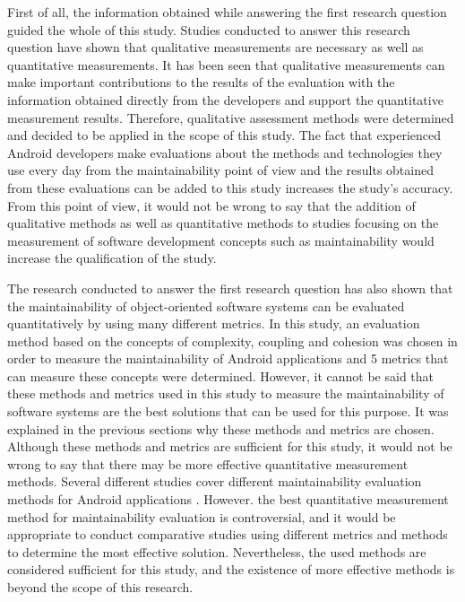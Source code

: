 First of all, the information obtained while answering the first research question guided the whole of this study. Studies conducted to answer this research question have shown that qualitative measurements are necessary as well as quantitative measurements. It has been seen that qualitative measurements can make important contributions to the results of the evaluation with the information obtained directly from the developers and support the quantitative measurement results. Therefore, qualitative assessment methods were determined and decided to be applied in the scope of this study. The fact that experienced Android developers make evaluations about the methods and technologies they use every day from the maintainability point of view and the results obtained from these evaluations can be added to this study increases the study's accuracy. From this point of view, it would not be wrong to say that the addition of qualitative methods as well as quantitative methods to studies focusing on the measurement of software development concepts such as maintainability would increase the qualification of the study.

The research conducted to answer the first research question has also shown that the maintainability of object-oriented software systems can be evaluated quantitatively by using many different metrics. In this study, an evaluation method based on the concepts of complexity, coupling and cohesion was chosen in order to measure the maintainability of Android applications and 5 metrics that can measure these concepts were determined. However, it cannot be said that these methods and metrics used in this study to measure the maintainability of software systems are the best solutions that can be used for this purpose. It was explained in the previous sections why these methods and metrics are chosen. Although these methods and metrics are sufficient for this study, it would not be wrong to say that there may be more effective quantitative measurement methods. Several different studies cover different maintainability evaluation methods for Android applications \cite{34,43}. However. the best quantitative measurement method for maintainability evaluation is controversial, and it would be appropriate to conduct comparative studies using different metrics and methods to determine the most effective solution. Nevertheless, the used methods are considered sufficient for this study, and the existence of more effective methods is beyond the scope of this research.